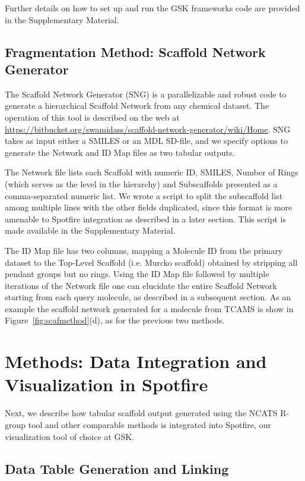 \documentclass[journal=jacsat,manuscript=article]{achemso}
\newcommand*\fref[1]{Figure~\ref{fig:#1}}
\begin{document}
Further details on how to set up and run the GSK frameworks code are
provided in the Supplementary Material.

\subsection{Fragmentation Method: Scaffold Network Generator}
\label{sec:SNG}
The Scaffold Network Generator (SNG) \cite{Matlock2013SNG} is a
parallelizable and robust code to generate a hierarchical Scaffold
Network from any chemical dataset. The operation of this tool is
described on the web at
\url{https://bitbucket.org/swamidass/scaffold-network-generator/wiki/Home}. SNG
takes as input either a SMILES or an MDL SD-file, and we specify
options to generate the Network and ID Map files as two tabular
outputs.

The Network file lists each Scaffold with numeric ID, SMILES, Number
of Rings (which serves as the level in the hierarchy) and Subscaffolds
presented as a comma-separated numeric list. We wrote a script to
split the subscaffold list among multiple lines with the other fields
duplicated, since this format is more amenable to Spotfire integration
as described in a later section.  This script is made available in the
Supplementary Material.

The ID Map file has two columns, mapping a Molecule ID from the primary dataset to the Top-Level Scaffold (i.e. Murcko scaffold) obtained by stripping all pendant groups but no rings. Using the ID Map file followed by multiple iterations of the Network file one can elucidate the entire Scaffold Network starting from each query molecule, as described in a subsequent section.  As an example the scaffold network generated for a molecule from TCAMS is show in \fref{scafmethod}(d), as for the previous two methods.


\section{Methods: Data Integration and Visualization in Spotfire}
\label{sec:methods2}

Next, we describe how tabular scaffold output generated using the
NCATS R-group tool and other comparable methods is integrated into
Spotfire, our visualization tool of choice at GSK.

\subsection{Data Table Generation and Linking}
\end{document}

